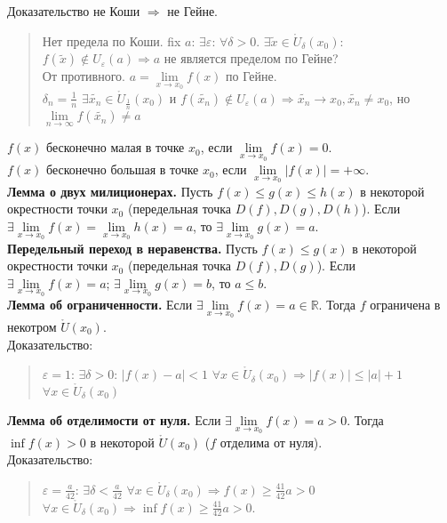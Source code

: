 \documentclass{article}
\begin{document}
	Доказательство не Коши $\Rightarrow$ не Гейне.
	\begin{quote}
		Нет предела по Коши. fix $a$: $\exists \varepsilon$: $\forall \delta > 0$. $\exists \tilde{x} \in \mathring{U}_{\delta}(x_0)$: $f(\tilde{x}) \not\in U_{\varepsilon}(a) \Rightarrow a$ не является пределом по Гейне? \\
		От противного. $a = \lim \limits_{x \rightarrow x_0} f(x)$ по Гейне. \\
		$\delta_n = \frac{1}{n}$ $\exists \tilde{x_n} \in \mathring{U}_{\frac{1}{n}}(x_0)$ и $f(\tilde{x_n}) \not\in U_{\varepsilon}(a) \Rightarrow \tilde{x_n} \rightarrow x_0, \tilde{x_n} \not= x_0$, но $\lim \limits_{n \rightarrow \infty} f(\tilde{x_n}) \not= a$
	\end{quote}
	$f(x)$ бесконечно малая в точке $x_0$, если $\lim \limits_{x \rightarrow x_0} f(x) = 0$. \\
	$f(x)$ бесконечно большая в точке $x_0$, если $\lim \limits_{x \rightarrow x_0} |f(x)| = +\infty$. \\
	\textbf{Лемма о двух милиционерах.} Пусть $f(x) \leqslant g(x) \leqslant h(x)$ в некоторой окрестности точки $x_0$ (передельная точка $D(f), D(g), D(h)$). Если $\exists \lim \limits_{x \rightarrow x_0} f(x) = \lim \limits_{x \rightarrow x_0} h(x) = a$, то $\exists \lim \limits_{x \rightarrow x_0} g(x) = a$. \\
	\textbf{Передельный переход в неравенства.} Пусть $f(x) \leqslant g(x)$ в некоторой окрестности точки $x_0$ (передельная точка $D(f), D(g)$). Если $\exists \lim \limits_{x \rightarrow x_0} f(x) = a$; $\exists \lim \limits_{x \rightarrow x_0} g(x) = b$, то $a \leqslant b$. \\
	\textbf{Лемма об ограниченности.} Если $\exists \lim \limits_{x \rightarrow x_0} f(x) = a \in \mathbb{R}$. Тогда $f$ ограничена в некотром $\mathring{U}(x_0)$. \\
	Доказательство:
	\begin{quote}
		$\varepsilon = 1$: $\exists \delta > 0$: $|f(x) - a| < 1$ $\forall x \in \mathring{U}_{\delta}(x_0) \Rightarrow |f(x)| \leqslant |a| + 1$ $\forall x \in \mathring{U}_{\delta}(x_0)$
	\end{quote}
	\textbf{Лемма об отделимости от нуля.} Если $\exists \lim \limits_{x \rightarrow x_0} f(x) = a > 0$. Тогда $\inf f(x) > 0$ в некоторой $\mathring{U}(x_0)$ ($f$ отделима от нуля). \\
	Доказательство:
	\begin{quote}
		$\varepsilon = \frac{a}{42}$: $\exists \delta < \frac{a}{42}$ $\forall x \in \mathring{U}_{\delta}(x_0) \Rightarrow f(x) \geqslant \frac{41}{42}a > 0$ $\forall x \in \mathring{U}_{\delta}(x_0) \Rightarrow \inf f(x) \geqslant \frac{41}{42}a > 0$.
	\end{quote}
\end{document}
